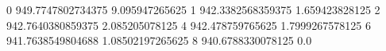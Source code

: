 0 949.7747802734375 9.095947265625
1 942.3382568359375 1.659423828125
2 942.7640380859375 2.085205078125
4 942.478759765625 1.7999267578125
6 941.7638549804688 1.08502197265625
8 940.6788330078125 0.0

